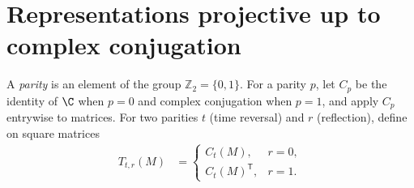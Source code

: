 \section{Representations projective up to complex conjugation}
\label{sec:projective_conjugate}

\begin{definition}
    \label{def:symmetry_parity}
    \leanok
    A \emph{parity} is an element of the group $\mathbb Z_2=\{0,1\}$. For a
    parity $p$, let $C_p$ be the identity of $\C$ when $p=0$ and complex
    conjugation when $p=1$, and apply $C_p$ entrywise to matrices. For two
    parities $t$ (time reversal) and $r$ (reflection), define on square
    matrices
    \begin{align}
        T_{t,r}(M) & =
        \begin{cases}
            C_t(M),             & r=0, \\
            C_t(M)^{\mathsf T}, & r=1.
        \end{cases}
        \label{eq:symmetry_parity_action}
    \end{align}
\end{definition}

